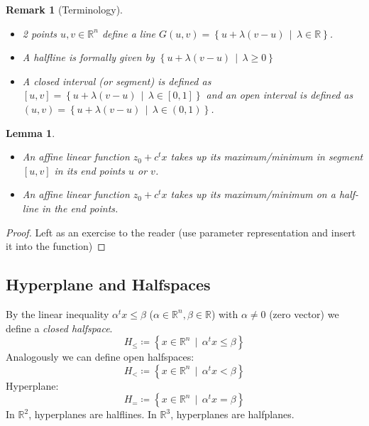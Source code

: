 \documentclass[a4paper]{article}
\newcounter{lecref}[section]
\numberwithin{lecref}{section}
\newtheorem{lemma}[lecref]{Lemma}
\newtheorem*{Remark}{Remark}
\newcommand{\SetDef}[2]{\left\{#1\,\mid\,#2\right\}}
\begin{document}
\begin{Remark}[Terminology] \hfill{}
  \begin{itemize}
  	\item 2 points $u, v \in \mathbb R^n$ define a \emph{line} $G(u, v) = \SetDef{u + \lambda (v - u)}{\lambda \in \mathbb R}$. 
  	\item A \emph{halfline} is formally given by $\SetDef{u + \lambda (v - u)}{\lambda \geq 0}$ 
  	\item A \emph{closed interval} (or \emph{segment}) is defined as $[u, v] = \SetDef{u + \lambda (v - u)}{\lambda \in [0, 1]}$ and
  		an \emph{open interval} is defined as $(u, v) = \SetDef{u + \lambda (v - u)}{\lambda \in (0, 1)}$. 
  \end{itemize}
\end{Remark}

\begin{lemma}
	\label{lemma:1.1}
	\begin{itemize}
		\item An affine linear function $z_0 + c^t x$ takes up its maximum/minimum in segment $[u, v]$ in its end points $u$ or $v$.
		\item An affine linear function $z_0 + c^t x$ takes up its maximum/minimum on a half-line in the end points.
	\end{itemize}
\end{lemma}
\begin{proof}
	Left as an exercise to the reader (use parameter representation and insert it into the function)
\end{proof}

\subsection{Hyperplane and Halfspaces}

By the linear inequality $\alpha^t x \leq \beta$ ($\alpha \in \mathbb R^n, \beta \in \mathbb R$) with $\alpha \neq 0$ (zero vector) we define a \emph{closed halfspace}.
\[ H_{\leq} \coloneqq \SetDef{x \in \mathbb R^n}{\alpha^t x \leq \beta} \]
Analogously we can define open halfspaces:
\[ H_{<} \coloneqq \SetDef{x \in \mathbb R^n}{\alpha^t x < \beta} \]
Hyperplane:
\[ H_{=} \coloneqq \SetDef{x \in \mathbb R^n}{\alpha^t x = \beta} \]
In $\mathbb R^2$, hyperplanes are halflines.
In $\mathbb R^3$, hyperplanes are halfplanes.
\end{document}
